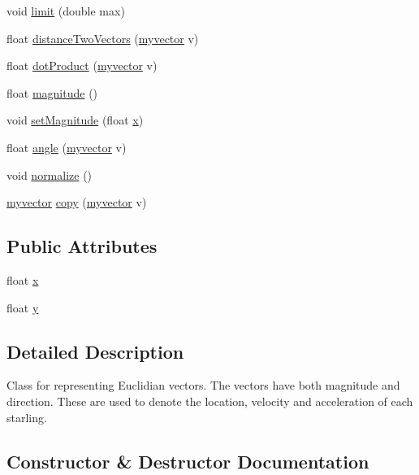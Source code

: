 \begin{DoxyCompactItemize}
\item 
void \hyperlink{classmyvector_a7513dd63482f8da0391482a42ec94716}{limit} (double max)
\item 
float \hyperlink{classmyvector_a3b88ac1b07500053fcced210f919e1d2}{distance\+Two\+Vectors} (\hyperlink{classmyvector}{myvector} v)
\item 
float \hyperlink{classmyvector_aeb8789b346cb5622637bc4892ecf81f3}{dot\+Product} (\hyperlink{classmyvector}{myvector} v)
\item 
float \hyperlink{classmyvector_a262a2cb9fee43e76d047518236b24ac4}{magnitude} ()
\item 
void \hyperlink{classmyvector_a7dd9ce447a27dccec70dda20b4d6c862}{set\+Magnitude} (float \hyperlink{classmyvector_a1e3915c15a349ccf949bb1751a5601c7}{x})
\item 
float \hyperlink{classmyvector_a68e76f412562234f077583902873d14a}{angle} (\hyperlink{classmyvector}{myvector} v)
\item 
void \hyperlink{classmyvector_ac0ca9829a310802c12d3bfc246dec920}{normalize} ()
\item 
\hyperlink{classmyvector}{myvector} \hyperlink{classmyvector_a5d48deffc52b7710383eccf82581e72e}{copy} (\hyperlink{classmyvector}{myvector} v)
\end{DoxyCompactItemize}
\subsection*{Public Attributes}
\begin{DoxyCompactItemize}
\item 
float \hyperlink{classmyvector_a1e3915c15a349ccf949bb1751a5601c7}{x}
\item 
float \hyperlink{classmyvector_a44a88317051b0eacb7d9a1fb341879ae}{y}
\end{DoxyCompactItemize}


\subsection{Detailed Description}
Class for representing Euclidian vectors. The vectors have both magnitude and direction. These are used to denote the location, velocity and acceleration of each starling. 

\subsection{Constructor \& Destructor Documentation}
